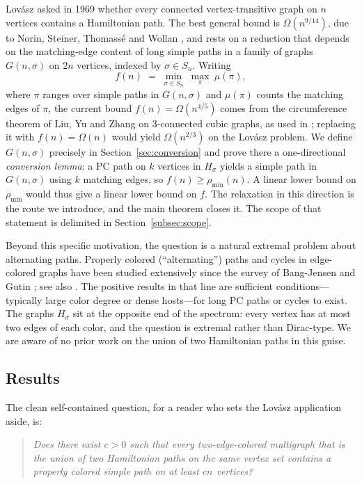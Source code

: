 \documentclass[11pt]{article}
\theoremstyle{definition}
\newcommand{\pmin}{\rho_{\min}}
\begin{document}
Lov\'asz \cite{Lov70} asked in 1969 whether every connected vertex-transitive graph on
$n$ vertices contains a Hamiltonian path. The best general bound is $\Omega(n^{9/14})$,
due to Norin, Steiner, Thomass\'e and Wollan \cite{NSTW25}, and rests on a reduction
that depends on the matching-edge content of long simple paths in a family of graphs
$G(n,\sigma)$ on $2n$ vertices, indexed by $\sigma \in S_n$. Writing
\[
  f(n) \;=\; \min_{\sigma\in S_n}\ \max_\pi\ \mu(\pi),
\]
where $\pi$ ranges over simple paths in $G(n,\sigma)$ and $\mu(\pi)$ counts the
matching edges of $\pi$, the current bound $f(n) = \Omega(n^{4/5})$ comes from the
circumference theorem of Liu, Yu and Zhang \cite{LYZ18} on $3$-connected cubic graphs,
as used in \cite{NSTW25}; replacing it with $f(n) = \Omega(n)$ would yield
$\Omega(n^{2/3})$ on the Lov\'asz problem. We define $G(n,\sigma)$ precisely in
Section~\ref{sec:conversion} and prove there a one-directional \emph{conversion lemma}:
a PC path on $k$ vertices in $H_\sigma$ yields a simple path in $G(n,\sigma)$ using $k$
matching edges, so $f(n) \ge \pmin(n)$. A linear lower bound on $\pmin$ would thus give
a linear lower bound on $f$. The relaxation in this direction is the route we
introduce, and the main theorem closes it. The scope of that statement is delimited in
Section~\ref{subsec:scope}.

Beyond this specific motivation, the question is a natural extremal problem about
alternating paths. Properly colored (``alternating'') paths and cycles in edge-colored
graphs have been studied extensively since the survey of Bang-Jensen and Gutin
\cite{BJG97}; see also \cite{GK09,ABMMM10}. The positive results in that line are
sufficient conditions---typically large color degree or dense hosts---for long PC paths
or cycles to exist. The graphs $H_\sigma$ sit at the opposite end of the spectrum:
every vertex has at most two edges of each color, and the question is extremal rather
than Dirac-type. We are aware of no prior work on the union of two Hamiltonian paths in
this guise.

\subsection{Results}

The clean self-contained question, for a reader who sets the Lov\'asz application
aside, is:

\begin{quote}
\emph{Does there exist $c>0$ such that every two-edge-colored multigraph that is the
union of two Hamiltonian paths on the same vertex set contains a properly colored
simple path on at least $cn$ vertices?}
\end{quote}
\end{document}
